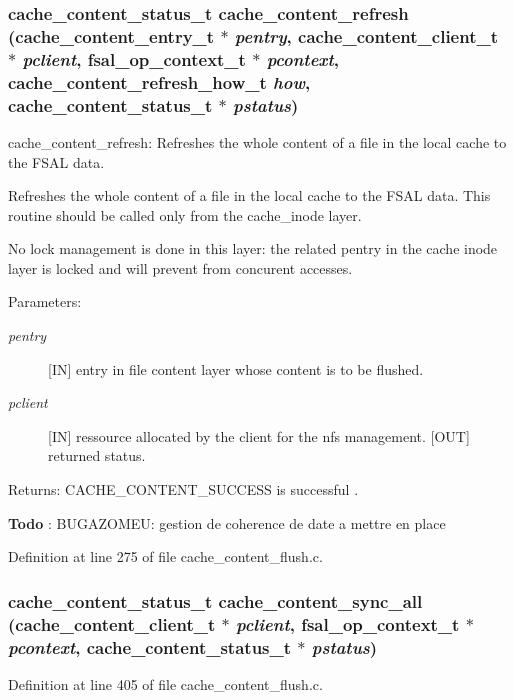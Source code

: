 \subsubsection[{cache\_\-content\_\-refresh}]{\setlength{\rightskip}{0pt plus 5cm}cache\_\-content\_\-status\_\-t cache\_\-content\_\-refresh (cache\_\-content\_\-entry\_\-t $\ast$ {\em pentry}, \/  cache\_\-content\_\-client\_\-t $\ast$ {\em pclient}, \/  fsal\_\-op\_\-context\_\-t $\ast$ {\em pcontext}, \/  cache\_\-content\_\-refresh\_\-how\_\-t {\em how}, \/  cache\_\-content\_\-status\_\-t $\ast$ {\em pstatus})}\label{cache__content__flush_8c_8caa78929e28b45a53868eb38c0d54a2}


cache\_\-content\_\-refresh: Refreshes the whole content of a file in the local cache to the FSAL data.

Refreshes the whole content of a file in the local cache to the FSAL data. This routine should be called only from the cache\_\-inode layer.

No lock management is done in this layer: the related pentry in the cache inode layer is locked and will prevent from concurent accesses.

\begin{Desc}
\item[Parameters:]
\begin{description}
\item[{\em pentry}][IN] entry in file content layer whose content is to be flushed. \item[{\em pclient}][IN] ressource allocated by the client for the nfs management.  [OUT] returned status.\end{description}
\end{Desc}
\begin{Desc}
\item[Returns:]CACHE\_\-CONTENT\_\-SUCCESS is successful .\end{Desc}
\begin{Desc}
\item[{\bf Todo}]: BUGAZOMEU: gestion de coherence de date a mettre en place \end{Desc}


Definition at line 275 of file cache\_\-content\_\-flush.c.
\subsubsection[{cache\_\-content\_\-sync\_\-all}]{\setlength{\rightskip}{0pt plus 5cm}cache\_\-content\_\-status\_\-t cache\_\-content\_\-sync\_\-all (cache\_\-content\_\-client\_\-t $\ast$ {\em pclient}, \/  fsal\_\-op\_\-context\_\-t $\ast$ {\em pcontext}, \/  cache\_\-content\_\-status\_\-t $\ast$ {\em pstatus})}\label{cache__content__flush_8c_479b822aceaf5a1bc414d603b250cc84}




Definition at line 405 of file cache\_\-content\_\-flush.c.